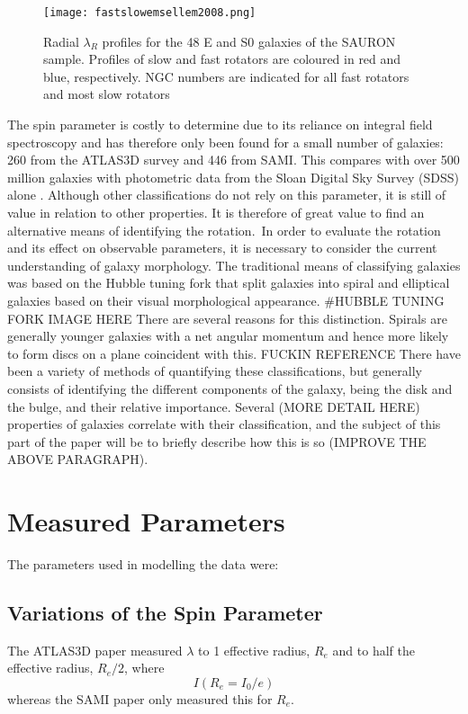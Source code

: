 \begin{figure}[h]
	\caption{Radial $\lambda_{R}$ profiles for the 48 E and S0 galaxies of the SAURON
	sample. Profiles of slow and fast rotators are coloured in red and blue, respectively.
	NGC numbers are indicated for all fast rotators and most slow
	rotators \cite[p.6]{Emsellem2011}}
	\centering
	\texttt{[image: fastslowemsellem2008.png]}
\end{figure}
The spin parameter is costly to determine due to its reliance on integral field spectroscopy and has therefore only been found for a small number of galaxies: 260 from the ATLAS3D survey and 446 from SAMI. This compares with over 500 million galaxies with photometric data from the Sloan Digital Sky Survey (SDSS) alone \cite{SDSS}. Although other classifications do not rely on this parameter, it is still of value in relation to other properties. It is therefore of great value to find an alternative means of identifying the rotation.\
In order to evaluate the rotation and its effect on observable parameters, it is necessary to consider the current understanding of galaxy morphology. The traditional means of classifying galaxies was based on the Hubble tuning fork that split galaxies into spiral and elliptical galaxies based on their visual morphological appearance.
#HUBBLE TUNING FORK IMAGE HERE
There are several reasons for this distinction. Spirals are generally younger galaxies with a net angular momentum and hence more likely to form discs on a plane coincident with this. FUCKIN REFERENCE
There have been a variety of methods of quantifying these classifications, but generally consists of identifying the different components of the galaxy, being the disk and the bulge, and their relative importance.  Several (MORE DETAIL HERE) properties of galaxies correlate with their classification, and the subject of this part of the paper will be to briefly describe how this is so (IMPROVE THE ABOVE PARAGRAPH).
\section{Measured Parameters}
The parameters used in modelling the data were:
\subsection{Variations of the Spin Parameter}
The ATLAS3D paper measured $\lambda$ to 1 effective radius, $R_{e}$ and to half the effective radius, $R_{e}/2$, where 
\begin{equation}
I(R_{e}=I_{0}/e)
\end{equation}
whereas the SAMI paper only measured this for $R_{e}$\cite[p.~3]{Cortese2016}. 
